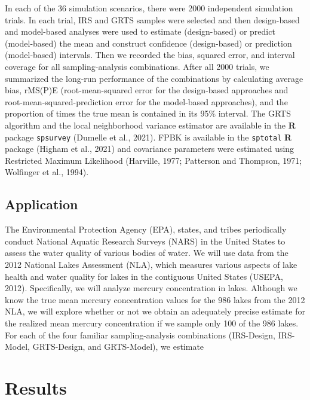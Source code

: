\documentclass[]{elsarticle} %
\begin{document}
In each of the 36 simulation scenarios, there were 2000 independent
simulation trials. In each trial, IRS and GRTS samples were selected and
then design-based and model-based analyses were used to estimate
(design-based) or predict (model-based) the mean and construct
confidence (design-based) or prediction (model-based) intervals. Then we
recorded the bias, squared error, and interval coverage for all
sampling-analysis combinations. After all 2000 trials, we summarized the
long-run performance of the combinations by calculating average bias,
rMS(P)E (root-mean-squared error for the design-based approaches and
root-mean-squared-prediction error for the model-based approaches), and
the proportion of times the true mean is contained in its 95\% interval.
The GRTS algorithm and the local neighborhood variance estimator are
available in the \textbf{\textsf{R}} package \texttt{spsurvey} (Dumelle
et al., 2021). FPBK is available in the \texttt{sptotal}
\textbf{\textsf{R}} package (Higham et al., 2021) and covariance
parameters were estimated using Restricted Maximum Likelihood (Harville,
1977; Patterson and Thompson, 1971; Wolfinger et al., 1994).

\hypertarget{sec:mm_app}{%
\subsection{Application}\label{sec:mm_app}}

The Environmental Protection Agency (EPA), states, and tribes
periodically conduct National Aquatic Research Surveys (NARS) in the
United States to assess the water quality of various bodies of water. We
will use data from the 2012 National Lakes Assessment (NLA), which
measures various aspects of lake health and water quality for lakes in
the contiguous United States (USEPA, 2012). Specifically, we will
analyze mercury concentration in lakes. Although we know the true mean
mercury concentration values for the 986 lakes from the 2012 NLA, we
will explore whether or not we obtain an adequately precise estimate for
the realized mean mercury concentration if we sample only 100 of the 986
lakes. For each of the four familiar sampling-analysis combinations
(IRS-Design, IRS-Model, GRTS-Design, and GRTS-Model), we estimate

\hypertarget{sec:results}{%
\section{Results}\label{sec:results}}
\end{document}
